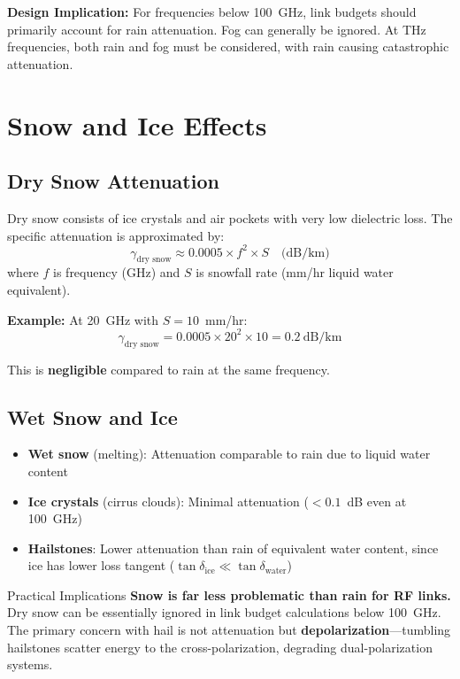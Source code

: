 \textbf{Design Implication:} For frequencies below 100~GHz, link budgets should primarily account for rain attenuation. Fog can generally be ignored. At THz frequencies, both rain and fog must be considered, with rain causing catastrophic attenuation.

\section{Snow and Ice Effects}

\subsection{Dry Snow Attenuation}

Dry snow consists of ice crystals and air pockets with very low dielectric loss. The specific attenuation is approximated by:
\begin{equation}
\gamma_{\text{dry snow}} \approx 0.0005 \times f^2 \times S \quad \text{(dB/km)}
\label{eq:dry-snow}
\end{equation}
where $f$ is frequency (GHz) and $S$ is snowfall rate (mm/hr liquid water equivalent).

\textbf{Example:} At 20~GHz with $S = 10$~mm/hr:
\begin{equation}
\gamma_{\text{dry snow}} = 0.0005 \times 20^2 \times 10 = 0.2~\text{dB/km}
\end{equation}

This is \textbf{negligible} compared to rain at the same frequency.

\subsection{Wet Snow and Ice}

\begin{itemize}
\item \textbf{Wet snow} (melting): Attenuation comparable to rain due to liquid water content
\item \textbf{Ice crystals} (cirrus clouds): Minimal attenuation ($< 0.1$~dB even at 100~GHz)
\item \textbf{Hailstones}: Lower attenuation than rain of equivalent water content, since ice has lower loss tangent ($\tan\delta_{\text{ice}} \ll \tan\delta_{\text{water}}$)
\end{itemize}

\begin{calloutbox}{Practical Implications}
\textbf{Snow is far less problematic than rain for RF links.} Dry snow can be essentially ignored in link budget calculations below 100~GHz. The primary concern with hail is not attenuation but \textbf{depolarization}---tumbling hailstones scatter energy to the cross-polarization, degrading dual-polarization systems.
\end{calloutbox}

